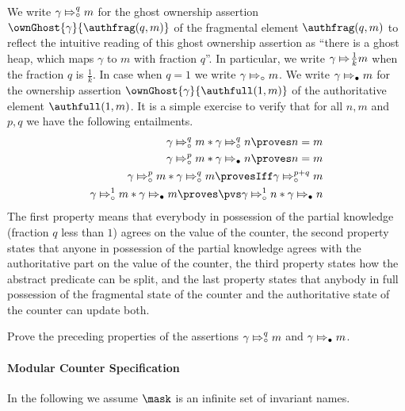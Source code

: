 We write $\gamma \Mapsto^{q}_{\circ} m$ for the ghost ownership assertion $\ownGhost{\gamma}{\authfrag (q,m)}$ of the fragmental element $\authfrag (q, m)$ to reflect the intuitive reading of this ghost ownership assertion as ``there is a ghost heap, which maps $\gamma$ to $m$ with fraction $q$''.
In particular, we write $\gamma \Mapsto\kern-0.5ex\tfrac{1}{k} m$ when the fraction $q$ is $\frac{1}{k}$.
In case when $q = 1$ we write $\gamma \Mapsto_{\circ} m$.
We write $\gamma \Mapsto_{\bullet} m$ for the ownership assertion $\ownGhost{\gamma}{\authfull (1, m)}$ of the authoritative element $\authfull (1, m)$.
It is a simple exercise to verify that for all $n, m$ and $p, q$ we have the following entailments.
\begin{align}
  \abstractstate{\gamma}{q}{m} \ast \abstractstate{\gamma}{q}{n} \proves n = m \label{eq:ra-abstract-state-eq}\\
  \abstractstate{\gamma}{p}{m} \ast \abstractstateauth{\gamma}{n} \proves n = m \label{eq:ra-abstract-state-auth-eq}\\
  \abstractstate{\gamma}{p}{m} \ast \abstractstate{\gamma}{q}{m} \provesIff \abstractstate{\gamma}{p+q}{m} \label{eq:ra-abstract-state-sum}  \\
  \abstractstate{\gamma}{1}{m} \ast \abstractstateauth{\gamma}{m} \proves \pvs \abstractstate{\gamma}{1}{n} \ast \abstractstateauth{\gamma}{n} \label{eq:ra-abstract-state-upd}
\end{align}
The first property means that everybody in possession of the partial knowledge (fraction $q$ less than $1$) agrees on the value of the counter, the second property states that anyone in possession of the partial knowledge agrees with the authoritative part on the value of the counter, 
 the third property states how the abstract predicate can be split, and the last property states that anybody in full possession of the fragmental state of the counter and the authoritative state of the counter can update both.
\begin{exercise}
  \label{ex:counter-ghost-state-1}
  Prove the preceding properties of the assertions $\gamma \Mapsto^{q}_{\circ} m$ and $\gamma \Mapsto_{\bullet} m$.
\end{exercise}


\paragraph{Modular Counter Specification}

In the following we assume $\mask$ is an infinite set of invariant names.

